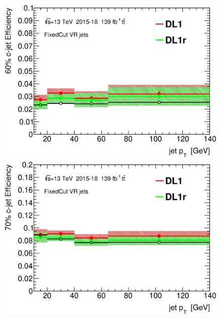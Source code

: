 \documentclass[letterpaper,12pt]{article}
\begin{document}
\begin{figure}[H]
\begin{minipage}[b]{.45\textwidth}
\centering
\includegraphics[width=1\textwidth]{SFplots_december/DL1allVRJetsDec_DL1rallVRJetsDec/eff60.eps}
\end{minipage}\hfill
\begin{minipage}[b]{.45\textwidth}
\centering
\includegraphics[width=1\textwidth]{SFplots_december/DL1allVRJetsDec_DL1rallVRJetsDec/eff70.eps}
\end{minipage}\hfill
\begin{minipage}[b]{.45\textwidth}
\centering

\end{minipage}
\end{figure}
\end{document}
